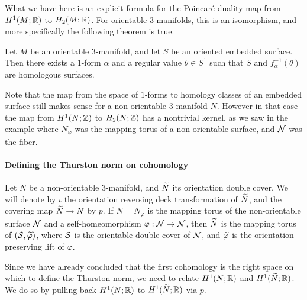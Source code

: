 What we have here is an explicit formula for the Poincar\'e duality map from $H^1(M; \mathbb{R})$ to $H_2(M; \mathbb{R})$.
For orientable $3$-manifolds, this is an isomorphism, and more specifically the following theorem is true.
\begin{thm}
  \label{thm:orientable-poincare-duality}
  Let $M$ be an orientable $3$-manifold, and let $S$ be an oriented embedded surface. Then there exists a $1$-form
  $\alpha$ and a regular value $\theta \in S^1$ such that $S$ and $f_{\alpha}^{-1}(\theta)$ are homologous surfaces.
\end{thm}

Note that the map from the space of $1$-forms to homology classes of an embedded surface still makes sense for a non-orientable $3$-manifold $N$.
However in that case the map from $H^1(N; \mathbb{Z})$ to $H_2(N; \mathbb{Z})$ has a nontrivial kernel, as we saw in the example where $N_{\varphi}$ was the mapping torus of a non-orientable surface, and $\mathcal{N}$ was the fiber.

\paragraph{Defining the Thurston norm on cohomology}
Let $N$ be a non-orientable $3$-manifold, and $\widetilde{N}$ its orientation double cover.
We will denote by $\iota$ the orientation reversing deck transformation
of $\widetilde{N}$, and the covering map $\widetilde{N} \to N$ by $p$.
If $N=N_\varphi$ is the mapping torus of the non-orientable surface $\mathcal{N}$ and a self-homeomorphism $\varphi: \mathcal{N} \to \mathcal{N}$, then $\widetilde{N}$ is the mapping torus of $(\mathcal{S}, \widetilde{\varphi})$, where $\mathcal{S}$ is the orientable double cover of $\mathcal{N}$, and $\widetilde{\varphi}$ is the orientation preserving lift of $\varphi$.

Since we have already concluded that the first cohomology is the right space on which to define the Thurston norm, we need to relate $H^1(N; \mathbb{R})$ and $H^1(\widetilde{N}; \mathbb{R})$. 
We do so by pulling back $H^1(N;\mathbb{R})$ to $H^1(\widetilde{N};\mathbb{R})$ via $p$.

